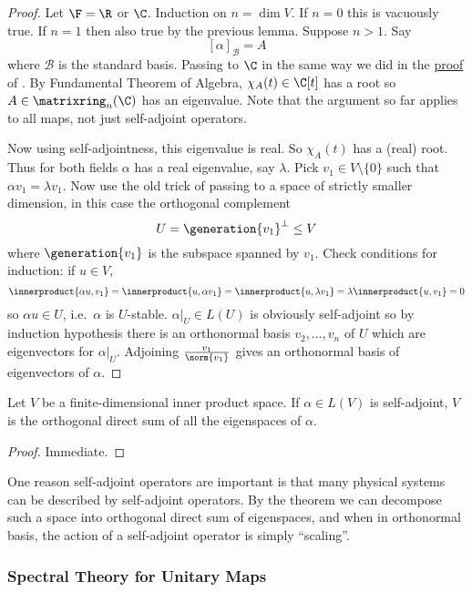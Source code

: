 \documentclass[a4paper]{article}
\newcommand*{\M}{\matrixring}
\newcommand*{\spans}{\generation}
\newcommand*{\basis}{\mathcal}
\newcommand*{\ip}{\innerproduct}
\theoremstyle{definition}
\begin{document}
\begin{proof}
  Let \(\F = \R\) or \(\C\). Induction on \(n = \dim V\). If \(n = 0\) this is vacuously true. If \(n = 1\) then also true by the previous lemma. Suppose \(n > 1\). Say
  \[
    [\alpha]_{\basis B} = A
  \]
  where \(\basis B\) is the standard basis. Passing to \(\C\) in the same way we did in the \hyperref[proof:determinant from characteristic]{proof} of . By Fundamental Theorem of Algebra, \(\chi_A(t) \in \C[t]\) has a root so \(A \in \M_n(\C)\) has an eigenvalue. Note that the argument so far applies to all maps, not just self-adjoint operators.

  Now using self-adjointness, this eigenvalue is real. So \(\chi_A(t)\) has a (real) root. Thus for both fields \(\alpha\) has a real eigenvalue, say \(\lambda\). Pick \(v_1 \in V \setminus \{0\}\) such that \(\alpha v_1 = \lambda v_1\). Now use the old trick of passing to a space of strictly smaller dimension, in this case the orthogonal complement
  \[
    U = \spans{v_1}^\perp \leq V
  \]
  where \(\spans{v_1}\) is the subspace spanned by \(v_1\). Check conditions for induction: if \(u \in V\),
  \[
    \ip{\alpha u, v_1} = \ip{u, \alpha v_1} = \ip{u, \lambda v_1} = \lambda \ip{u, v_1} = 0
  \]
  so \(\alpha u \in U\), i.e.\ \(\alpha\) is \(U\)-stable. \(\alpha|_U \in L(U)\) is obviously self-adjoint so by induction hypothesis there is an orthonormal basis \(v_2, \dots, v_n\) of \(U\) which are eigenvectors for \(\alpha|_U\). Adjoining \(\frac{v_1}{\norm{v_1}}\) gives an orthonormal basis of eigenvectors of \(\alpha\).
\end{proof}

\begin{corollary}
  Let \(V\) be a finite-dimensional inner product space. If \(\alpha \in L(V)\) is self-adjoint, \(V\) is the orthogonal direct sum of all the eigenspaces of \(\alpha\).
\end{corollary}

\begin{proof}
  Immediate.
\end{proof}

One reason self-adjoint operators are important is that many physical systems can be described by self-adjoint operators. By the theorem we can decompose such a space into orthogonal direct sum of eigenspaces, and when in orthonormal basis, the action of a self-adjoint operator is simply ``scaling''.

\subsubsection{Spectral Theory for Unitary Maps}
\end{document}
